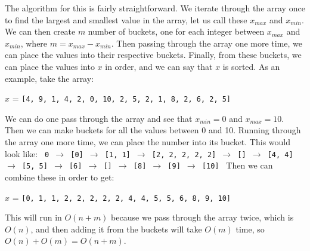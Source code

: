 \documentclass{article} %
\begin{document}

    The algorithm for this is fairly straightforward. We iterate through the array once to find 
    the largest and smallest value in the array, let us call these $x_{max}$ and $x_{min}$. We can then create $m$ 
    number of buckets, one for each integer between $x_{max}$ and $x_{min}$, where $m = x_{max} - x_{min}$. Then 
    passing through the array one more time, we can place the values into their respective buckets. 
    Finally, from these buckets, we can place the values into $x$ in order, and we can say that $x$ is sorted.
    As an example, take the array:
    \begin{center}
        $x$ = \texttt{[4, 9, 1, 4, 2, 0, 10, 2, 5, 2, 1, 8, 2, 6, 2, 5]}
    \end{center}
    We can do one pass through the array and see that $x_{min} = 0$ and $x_{max} = 10$. Then we can make 
    buckets for all the values between 0 and 10. Running through the array one more time, we can 
    place the number into its bucket. This would look like:
    \newline
        \texttt{
            0 $\rightarrow$ [0]  $\rightarrow$ [1, 1]  $\rightarrow$ [2, 2, 2, 2, 2]  $\rightarrow$ []  $\rightarrow$ [4, 4]  $\rightarrow$ [5, 5]  $\rightarrow$ [6]  $\rightarrow$ []  $\rightarrow$ [8]  $\rightarrow$ [9]  $\rightarrow$ [10] \newline}
    Then we can combine these in order to get:
    \begin{center}
        $x$ = \texttt{[0, 1, 1, 2, 2, 2, 2, 2, 4, 4, 5, 5, 6, 8, 9, 10]}
    \end{center}
    This will run in $O(n + m)$ because we pass through the array twice, which is $O(n)$, and then adding 
    it from the buckets will take $O(m)$ time, so $O(n) + O(m) = O(n + m)$.
\end{document}
